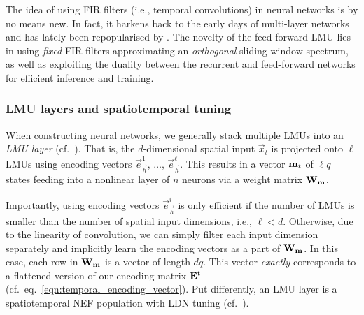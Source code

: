 The idea of using FIR filters (i.e., temporal convolutions) in neural networks is by no means new.
In fact, it harkens back to the early days of multi-layer networks \citep[e.g.,][]{waibel1989phoneme,back1991fir} and has lately been repopularised by \citet{bai2018empirical}.
The novelty of the feed-forward LMU lies in using \emph{fixed} FIR filters approximating an \emph{orthogonal} sliding window spectrum, as well as exploiting the duality between the recurrent and feed-forward networks for efficient inference and training.

\subsubsection{LMU layers and spatiotemporal tuning}
When constructing neural networks, we generally stack multiple LMUs into an \emph{LMU layer} (cf.~).
That is, the $d$-dimensional spatial input $\vec x_t$ is projected onto $\ell$ LMUs using encoding vectors $\vec e^1_{\vec h}$, $\ldots$, $\vec e^\ell_{\vec h}$.
This results in a vector $\mathbf{m}_t$ of $\ell q$ states feeding into a nonlinear layer of $n$ neurons via a weight matrix $\mathbf{W}_{\mathbf{m}}$.

Importantly, using encoding vectors $\vec e^i_{\vec h}$ is only efficient if the number of LMUs is smaller than the number of spatial input dimensions, i.e., $\ell < d$.
Otherwise, due to the linearity of convolution, we can simply filter each input dimension separately and implicitly learn the encoding vectors as a part of $\mathbf{W}_{\mathbf{m}}$.
In this case, each row in $\mathbf{W}_{\mathbf{m}}$ is a vector of length $d q$.
This vector \emph{exactly} corresponds to a flattened version of our encoding matrix $\mathbf{E}^\mathrm{t}$ (cf.~eq.~\ref{eqn:temporal_encoding_vector}).
Put differently, an LMU layer is a spatiotemporal NEF population with LDN tuning (cf.~).

